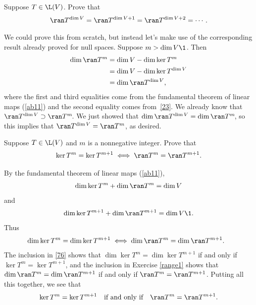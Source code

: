 \exercise
Suppose $T \in \L(V)$. Prove that\label{range3}
\[
\ran T^{\dim V} = \ran T^{\dim V + 1} = \ran T^{\dim V + 2} = \dotsb .
\]
\exercisedisplayend

\begin{Solution}
We could prove this from scratch, but instead let's make use of
the corresponding result already proved for null spaces.  Suppose $m > \dim V\1$.  Then
\begin{align*}
\dim \ran T^m &= \dim V - \dim \ker T^m \\
&= \dim V - \dim \ker T^{\dim V} \\
&= \dim \ran T^{\dim V},
\end{align*}
where the first and third equalities come from the fundamental theorem of linear maps (\ref{ab11}) and the second equality
comes from~\ref{23}.  We already know that $\ran T^{\dim V} \supset \ran T^m\!$.
We just showed that $\dim \ran T^{\dim V} = \dim \ran T^m\!$, so this
implies that \mbox{$\ran T^{\dim V} = \ran T^m$}, as desired.
\end{Solution}

\exercise
Suppose $T \in \L(V)$ and $m$ is a nonnegative integer. Prove that\label{kerran}
\[
\ker T^m = \ker T^{m+1} \iff \ran T^m = \ran T^{m+1}.
\]
\exercisedisplayend

\begin{Solution}
By the fundamental theorem of linear maps (\ref{ab11}),
\[
\dim \ker T^m + \dim \ran T^m = \dim V
\]
and
\[
\dim \ker T^{m+1} + \dim \ran T^{m+1} = \dim V\1.
\]
Thus
\[
\hspace*{-.1in}\dim \ker T^m = \dim \ker T^{m+1} \iff \dim \ran T^m = \dim \ran T^{m+1}.
\]
The inclusion in \ref{76} shows that $\dim \ker T^m = \dim \ker T^{m+1}$ if and only if $\ker T^m = \ker T^{m+1}$, and the inclusion in Exercise \ref{range1} shows that $\dim \ran T^m = \dim \ran T^{m+1}$ if and only if $\ran T^m = \ran T^{m+1}$. Putting all this together, we see that
\[
\ker T^m = \ker T^{m+1} \quad \text{if and only if} \quad \ran T^m = \ran T^{m+1}.
\]
\end{Solution}

